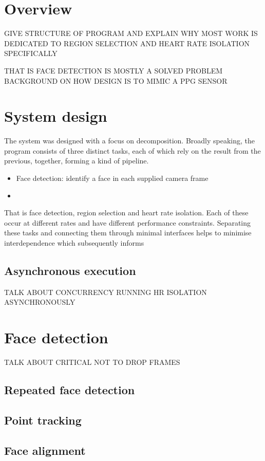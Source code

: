 \section{Overview}

GIVE STRUCTURE OF PROGRAM AND EXPLAIN WHY MOST WORK IS DEDICATED TO REGION
SELECTION AND HEART RATE ISOLATION SPECIFICALLY

THAT IS FACE DETECTION IS MOSTLY A SOLVED PROBLEM
BACKGROUND ON HOW DESIGN IS TO MIMIC A PPG SENSOR

\section{System design}
The system was designed with a focus on decomposition. Broadly speaking, the program consists of three distinct tasks, each of which rely on the result from the previous, together, forming a kind of pipeline. 
\begin{itemize}
    \item Face detection: identify a face in each supplied camera frame
    \item 
\end{itemize}
That is face detection, region selection and heart rate isolation. Each of these occur at different rates and have different performance constraints. Separating these tasks and connecting them through minimal interfaces helps to minimise interdependence which subsequently informs

\subsection{Asynchronous execution}
TALK ABOUT CONCURRENCY RUNNING HR ISOLATION ASYNCHRONOUSLY
\section{Face detection}
TALK ABOUT CRITICAL NOT TO DROP FRAMES
\subsection{Repeated face detection}
\subsection{Point tracking}
\subsection{Face alignment}

